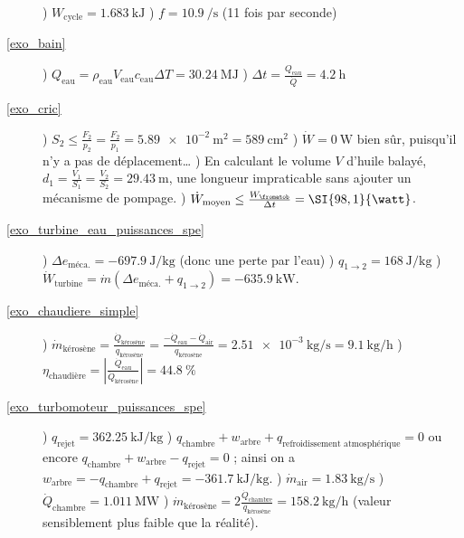 \begin{description}
				) $W_{\text{cycle}} = \SI{1,683}{\kilo\joule}$
				) $f = \SI{10,9}{\per\second}$ (11 fois par seconde)
	\item [\ref{exo_bain}]
				) $Q_{\text{eau}} = \rho_{\text{eau}} V_{\text{eau}} c_{\text{eau}} \Delta T = \SI{+30,24}{\mega\joule}$ 
				) $\Delta t = \frac{Q_{\text{eau}}}{\dot Q} = \SI{4,2}{\hour}$
	\item [\ref{exo_cric}] 	
				) $S_2 \leq \frac{F_2}{p_2} = \frac{F_2}{p_1} = \SI{5,89e-2}{\metre\squared} = \SI{589}{\centi\metre\squared}$
				) $\dot W = \SI{0}{\watt}$ bien sûr, puisqu’il n’y a pas de déplacement\ldots
				) En calculant le volume $V$ d’huile balayé, $d_1 = \frac{V_1}{S_1} = \frac{V_2}{S_2} = \SI{29,43}{\metre}$, une longueur impraticable sans ajouter un mécanisme de pompage.
				) $\dot W_{\text{moyen}} \leq \frac{W_\fromatob}{\Delta t} = \SI{98,1}{\watt}$.
	\item [\ref{exo_turbine_eau_puissances_spe}]
				) $\Delta e_{\text{méca.}} = \SI{-697,9}{\joule\per\kilogram}$ (donc une perte par l’eau)
				) $q_{1 \to 2} = \SI{+168}{\joule\per\kilogram}$
				) $\dot W_{\text{turbine}} = \dot m (\Delta e_{\text{méca.}} + q_{1 \to 2} ) = \SI{-635,9}{\kilo\watt}$.
	\item [\ref{exo_chaudiere_simple}] 	
				) $\dot m_{\text{kérosène}} = \frac{\dot Q_{\text{kérosène}}}{q_{\text{kérosène}}} = \frac{-\dot Q_{\text{eau}} - \dot Q_{\text{air}}}{q_{\text{kérosène}}} =  \SI{2,51e-3}{\kilogram\per\second} = \SI{9,1}{\kilogram\per\hour}	$
				) $\eta_{\text{chaudière}} = \left|\frac{\dot Q_{\text{eau}}}{\dot Q_{\text{kérosène}}}\right| = \SI{44,8}{\percent}$
	\item [\ref{exo_turbomoteur_puissances_spe}]
				) $q_{\text{rejet}} = \SI{+362,25}{\kilo\joule\per\kilogram}$
				) $q_{\text{chambre}} + w_{\text{arbre}} + q_{\text{refroidissement atmosphérique}} = 0$ ou encore $q_{\text{chambre}} + w_{\text{arbre}} - q_{\text{rejet}} = 0$ ; ainsi on a $w_{\text{arbre}} = - q_{\text{chambre}} + q_{\text{rejet}} = \SI{-361,7}{\kilo\joule\per\kilogram}$.
				) $\dot m_{\text{air}} = \SI{1,83}{\kilogram\per\second}$
				) $\dot Q_{\text{chambre}} = \SI{1,011}{\mega\watt}$
				) $\dot m_{\text{kérosène}} = 2 \frac{\dot Q_{\text{chambre}}}{q_{\text{kérosène}}} = \SI{158,2}{\kilogram\per\hour}$ (valeur sensiblement plus faible que la réalité).
\end{description}

